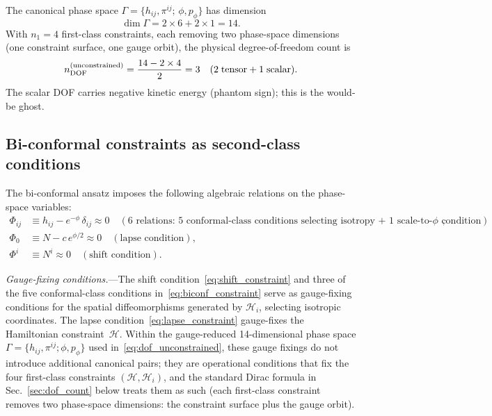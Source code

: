 \documentclass[11pt]{article}
\begin{document}
The canonical phase space
$\Gamma = \{h_{ij},\pi^{ij};\,\phi,p_\phi\}$
has dimension
\begin{equation}
\dim\Gamma = 2\times 6 + 2\times 1 = 14.
\end{equation}
With $n_1=4$ first-class constraints, each removing two phase-space dimensions (one constraint surface, one gauge orbit), the physical degree-of-freedom count is
\begin{equation}
n_{\rm DOF}^{(\rm unconstrained)}
  =\frac{14-2\times 4}{2}=3
  \quad(2\;\text{tensor}+1\;\text{scalar}).
\label{eq:dof_unconstrained}
\end{equation}
The scalar DOF carries negative kinetic energy (phantom sign); this is the would-be ghost.

\subsection{Bi-conformal constraints as second-class conditions}\label{sec:biconf_constr}

The bi-conformal ansatz imposes the following algebraic relations on the phase-space variables:
\begin{align}
\Phi_{ij}&\equiv h_{ij}-e^{-\phi}\,\delta_{ij}\approx 0
  \quad(\text{6 relations: 5 conformal-class conditions selecting isotropy + 1 scale-to-$\phi$ condition}),
  \label{eq:biconf_constraint}\\[4pt]
\Phi_0&\equiv N-c\,e^{\phi/2}\approx 0
  \quad(\text{lapse condition}),
  \label{eq:lapse_constraint}\\[4pt]
\Phi^i&\equiv N^i\approx 0
  \quad(\text{shift condition}).
  \label{eq:shift_constraint}
\end{align}

\textit{Gauge-fixing conditions.}---The shift condition~\eqref{eq:shift_constraint} and three of the five conformal-class conditions in~\eqref{eq:biconf_constraint} serve as gauge-fixing conditions for the spatial diffeomorphisms generated by $\mathcal{H}_i$, selecting isotropic coordinates.  The lapse condition~\eqref{eq:lapse_constraint} gauge-fixes the Hamiltonian constraint~$\mathcal{H}$.  Within the gauge-reduced 14-dimensional phase space $\Gamma=\{h_{ij},\pi^{ij};\phi,p_\phi\}$ used in~\eqref{eq:dof_unconstrained}, these gauge fixings do not introduce additional canonical pairs; they are operational conditions that fix the four first-class constraints $(\mathcal H,\mathcal H_i)$, and the standard Dirac formula in Sec.~\ref{sec:dof_count} below treats them as such (each first-class constraint removes two phase-space dimensions: the constraint surface plus the gauge orbit).
\end{document}
